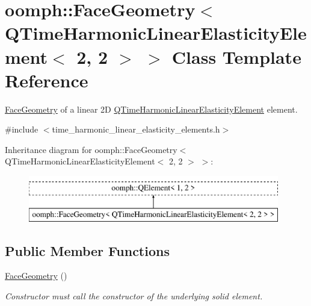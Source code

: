 \hypertarget{classoomph_1_1FaceGeometry_3_01QTimeHarmonicLinearElasticityElement_3_012_00_012_01_4_01_4}{}\section{oomph\+:\+:Face\+Geometry$<$ Q\+Time\+Harmonic\+Linear\+Elasticity\+Element$<$ 2, 2 $>$ $>$ Class Template Reference}
\label{classoomph_1_1FaceGeometry_3_01QTimeHarmonicLinearElasticityElement_3_012_00_012_01_4_01_4}


\hyperlink{classoomph_1_1FaceGeometry}{Face\+Geometry} of a linear 2D \hyperlink{classoomph_1_1QTimeHarmonicLinearElasticityElement}{Q\+Time\+Harmonic\+Linear\+Elasticity\+Element} element.  




{\ttfamily \#include $<$time\+\_\+harmonic\+\_\+linear\+\_\+elasticity\+\_\+elements.\+h$>$}

Inheritance diagram for oomph\+:\+:Face\+Geometry$<$ Q\+Time\+Harmonic\+Linear\+Elasticity\+Element$<$ 2, 2 $>$ $>$\+:\begin{figure}[H]
\begin{center}
\leavevmode
\includegraphics[height=2.000000cm]{classoomph_1_1FaceGeometry_3_01QTimeHarmonicLinearElasticityElement_3_012_00_012_01_4_01_4}
\end{center}
\end{figure}
\subsection*{Public Member Functions}
\begin{DoxyCompactItemize}
\item 
\hyperlink{classoomph_1_1FaceGeometry_3_01QTimeHarmonicLinearElasticityElement_3_012_00_012_01_4_01_4_a0ac41447cb823d082a7e0132bf95bc36}{Face\+Geometry} ()
\begin{DoxyCompactList}\small\item\em Constructor must call the constructor of the underlying solid element. \end{DoxyCompactList}\end{DoxyCompactItemize}


